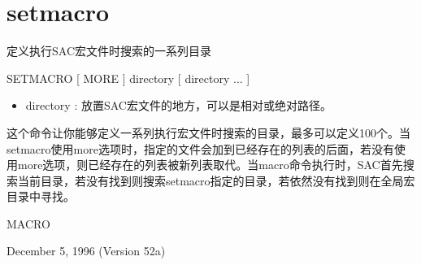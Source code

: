 \section{setmacro}
\label{cmd:setmacro}

定义执行SAC宏文件时搜索的一系列目录

SETMACRO  [ MORE ] directory [ directory ... ]

\begin{itemize}
\item directory : 放置SAC宏文件的地方，可以是相对或绝对路径。
\end{itemize}

这个命令让你能够定义一系列执行宏文件时搜索的目录，最多可以定义100个。当setmacro使用more选项时，指定的文件会加到已经存在的列表的后面，若没有使用more选项，则已经存在的列表被新列表取代。当macro命令执行时，SAC首先搜索当前目录，若没有找到则搜索setmacro指定的目录，若依然没有找到则在全局宏目录中寻找。

MACRO

December 5, 1996 (Version 52a)
